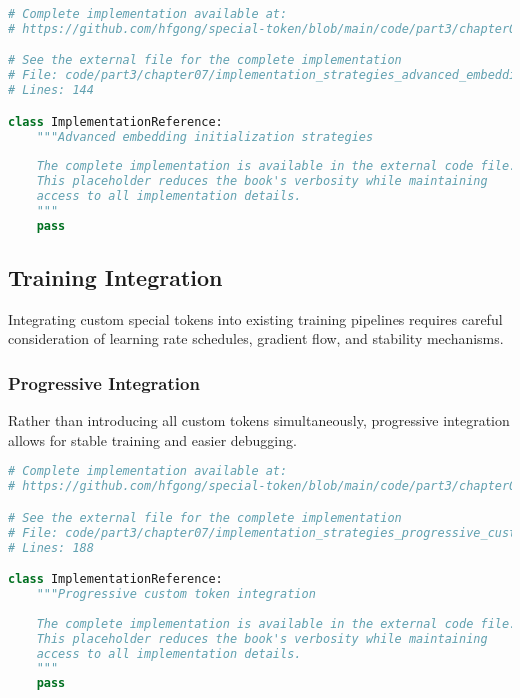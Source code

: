 \begin{lstlisting}[language=Python, caption={Advanced embedding initialization strategies}]
# Complete implementation available at:
# https://github.com/hfgong/special-token/blob/main/code/part3/chapter07/implementation_strategies_advanced_embedding_initializat.py

# See the external file for the complete implementation
# File: code/part3/chapter07/implementation_strategies_advanced_embedding_initializat.py
# Lines: 144

class ImplementationReference:
    """Advanced embedding initialization strategies
    
    The complete implementation is available in the external code file.
    This placeholder reduces the book's verbosity while maintaining
    access to all implementation details.
    """
    pass
\end{lstlisting}

\subsection{Training Integration}

Integrating custom special tokens into existing training pipelines requires careful consideration of learning rate schedules, gradient flow, and stability mechanisms.

\subsubsection{Progressive Integration}

Rather than introducing all custom tokens simultaneously, progressive integration allows for stable training and easier debugging.
\begin{comment}
Feedback: Explaining the "why" is important here. For example: "When adding new custom tokens to a pre-trained model, it's often best to 'freeze' the original model weights and only train the new token embeddings for a few epochs. This allows the new tokens to settle into the existing embedding space without catastrophically disrupting the pre-trained representations. After this initial phase, you can unfreeze the entire model for end-to-end fine-tuning."
\end{comment}

\begin{lstlisting}[language=Python, caption={Progressive custom token integration}]
# Complete implementation available at:
# https://github.com/hfgong/special-token/blob/main/code/part3/chapter07/implementation_strategies_progressive_custom_token_integ.py

# See the external file for the complete implementation
# File: code/part3/chapter07/implementation_strategies_progressive_custom_token_integ.py
# Lines: 188

class ImplementationReference:
    """Progressive custom token integration
    
    The complete implementation is available in the external code file.
    This placeholder reduces the book's verbosity while maintaining
    access to all implementation details.
    """
    pass
\end{lstlisting}


